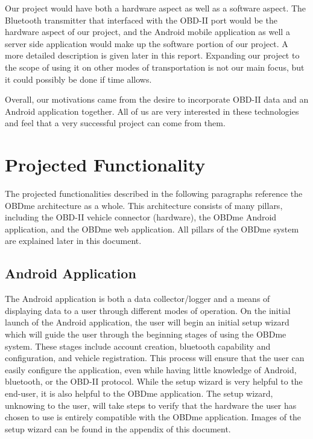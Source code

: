\documentclass[12pt]{article}
\begin{document}
Our project would have both a hardware aspect as well as a software aspect. The Bluetooth transmitter that interfaced with the OBD-II port would be the hardware aspect of our project, and the Android mobile application as well a server side application would make up the software portion of our project.  A more detailed description is given later in this report.  Expanding our project to the scope of using it on other modes of transportation is not our main focus, but it could possibly be done if time allows.

Overall, our motivations came from the desire to incorporate OBD-II data and an Android application together. All of us are very interested in these technologies and feel that a very successful project can come from them.

\section{Projected Functionality}\label{sec:ProjectedFunctionality}
The projected functionalities described in the following paragraphs reference the OBDme architecture as a whole.  This architecture consists of many pillars, including the OBD-II vehicle connector (hardware), the OBDme Android application, and the OBDme web application.  All pillars of the OBDme system are explained later in this document.

\subsection{Android Application}\label{subsec:AndroidApplication}
The Android application is both a data collector/logger and a means of displaying data to a user through different modes of operation.  On the initial launch of the Android application, the user will begin an initial setup wizard which will guide the user through the beginning stages of using the OBDme system.  These stages include account creation, bluetooth capability and configuration, and vehicle registration.  This process will ensure that the user can easily configure the application, even while having little knowledge of Android, bluetooth, or the OBD-II protocol.  While the setup wizard is very helpful to the end-user, it is also helpful to the OBDme application.  The setup wizard, unknowing to the user, will take steps to verify that the hardware the user has chosen to use is entirely compatible with the OBDme application.  Images of the setup wizard can be found in the appendix of this document.
\end{document}
